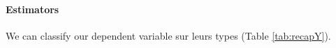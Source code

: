 \documentclass[a4paper, 11pt, onecolumn]{article}
\begin{document}


\paragraph{Estimators}

We can classify our dependent variable sur leurs types (Table \ref{tab:recapY}).
\end{document}
